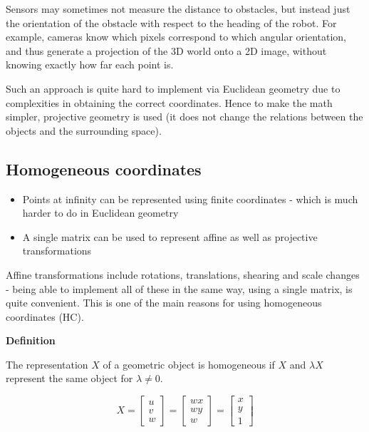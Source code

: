 \documentclass[a4paper]{article}
\begin{document}
Sensors may sometimes not measure the distance to obstacles, but instead just the orientation of the obstacle with respect to the heading of the robot. For example, cameras know which pixels correspond to which angular orientation, and thus generate a projection of the 3D world onto a 2D image, without knowing exactly how far each point is.

Such an approach is quite hard to implement via Euclidean geometry due to complexities in obtaining the correct coordinates. Hence to make the math simpler, projective geometry is used (it does not change the relations between the objects and the surrounding space).

\subsection{Homogeneous coordinates}

\begin{itemize}
    \item Points at infinity can be represented using finite coordinates - which is much harder to do in Euclidean geometry
    \item A single matrix can be used to represent affine as well as projective transformations
\end{itemize}

Affine transformations include rotations, translations, shearing and scale changes - being able to implement all of these in the same way, using a single matrix, is quite convenient. This is one of the main reasons for using homogeneous coordinates (HC).

\textbf{Definition}

The representation $X$ of a geometric object is homogeneous if $X$ and $\lambda X$ represent the same object for $\lambda \neq 0$.

\begin{equation*}
X =
\begin{bmatrix}
u\\v\\w
\end{bmatrix}
=
\begin{bmatrix}
wx\\wy\\w
\end{bmatrix}
=
\begin{bmatrix}
x\\y\\1
\end{bmatrix}
\end{equation*}
\end{document}
